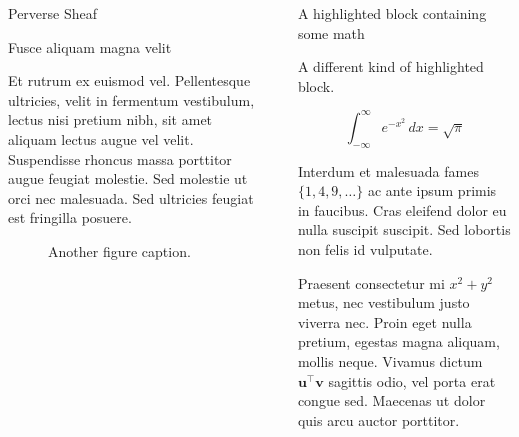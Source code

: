 \documentclass[final]{beamer}
\newlength{\sepwidth}
\newlength{\colwidth}
\newcommand{\separatorcolumn}{\begin{column}{\sepwidth}\end{column}}
\begin{document}
\begin{frame}[t]
\begin{columns}[t]
\begin{column}{\colwidth}
\begin{block}{Perverse Sheaf}
  \end{block}

  \begin{block}{Fusce aliquam magna velit}

    Et rutrum ex euismod vel. Pellentesque ultricies, velit in fermentum
    vestibulum, lectus nisi pretium nibh, sit amet aliquam lectus augue vel
    velit. Suspendisse rhoncus massa porttitor augue feugiat molestie. Sed
    molestie ut orci nec malesuada. Sed ultricies feugiat est fringilla
    posuere.

    \begin{figure}
      \centering
      \caption{Another figure caption.}
    \end{figure}

  \end{block}


\end{column}

\separatorcolumn

\begin{column}{\colwidth}

  \begin{exampleblock}{A highlighted block containing some math}

    A different kind of highlighted block.

    $$
    \int_{-\infty}^{\infty} e^{-x^2}\,dx = \sqrt{\pi}
    $$

    Interdum et malesuada fames $\{1, 4, 9, \ldots\}$ ac ante ipsum primis in
    faucibus. Cras eleifend dolor eu nulla suscipit suscipit. Sed lobortis non
    felis id vulputate.


    Praesent consectetur mi $x^2 + y^2$ metus, nec vestibulum justo viverra
    nec. Proin eget nulla pretium, egestas magna aliquam, mollis neque. Vivamus
    dictum $\mathbf{u}^\intercal\mathbf{v}$ sagittis odio, vel porta erat
    congue sed. Maecenas ut dolor quis arcu auctor porttitor.


\end{exampleblock}
\end{column}
\end{columns}
\end{frame}
\end{document}
